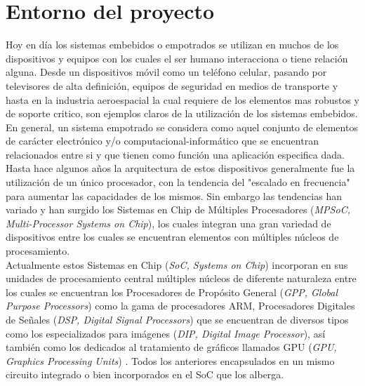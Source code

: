 
\chapter{Entorno del proyecto}
\label{ch:Entorno_del_proyecto}

Hoy en día los sistemas embebidos o empotrados se utilizan en muchos de los dispositivos
y equipos con los cuales el ser humano interacciona o tiene relación alguna. Desde un dispositivos
móvil como un teléfono celular, pasando por televisores de alta definición, equipos de seguridad
en medios de transporte y hasta en la industria aeroespacial la cual requiere de los elementos mas robustos
y de soporte critico, son ejemplos claros de la utilización de los sistemas embebidos.\\

En general, un sistema empotrado se considera como aquel conjunto de elementos de carácter electrónico y/o
computacional-informático que  se encuentran relacionados entre si y que tienen como función una aplicación 
especifica dada.\cite {LERTA} \cite{MK1} \\

Hasta hace algunos años la arquitectura de estos dispositivos generalmente fue la utilización de un único procesador, 
con la tendencia del "escalado en frecuencia" \cite{TAODES} para aumentar las capacidades de los mismos. Sin embargo
las tendencias han variado y han surgido los Sistemas en Chip de Múltiples Procesadores 
(\textit{MPSoC, Multi-Processor Systems on Chip}), los cuales integran una gran variedad de dispositivos entre los cuales
se encuentran elementos con múltiples núcleos de procesamiento.\\

Actualmente estos Sistemas en Chip (\textit{SoC, Systems on Chip}) incorporan en sus unidades de procesamiento central
múltiples núcleos de diferente naturaleza entre los cuales se encuentran los Procesadores de Propósito 
General (\textit{GPP, Global Purpose Processors}) como la gama de procesadores ARM, Procesadores Digitales de 
Señales (\textit{DSP, Digital Signal Processors}) que se encuentran de diversos tipos como los 
especializados para imágenes (\textit{DIP, Digital Image Processor}), así también como los dedicados al tratamiento de gráficos llamados 
GPU (\textit{GPU, Graphics Processing Units}) \cite{MK2}. Todos los anteriores encapsulados en un mismo circuito integrado o bien 
incorporados en el SoC que los alberga.\\

